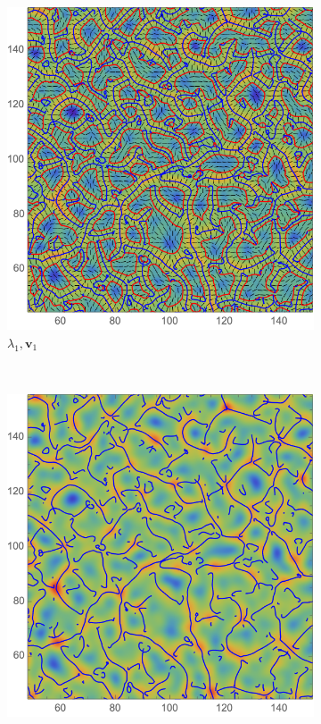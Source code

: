 \documentclass[a4paper, 11pt]{article}
\begin{document}
\begin{figure}
\centering
\begin{subfigure}[b]{0.49\textwidth}
\includegraphics[width=\textwidth]{Eulerian_L}
\caption{$\lambda_1,\bm{v}_1$}
\end{subfigure}~
\begin{subfigure}[b]{0.49\textwidth}
\includegraphics[width=\textwidth]{Eulerian_dens}

\end{subfigure}
\end{figure}
\end{document}
